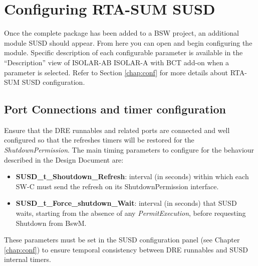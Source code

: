 \section{Configuring RTA-SUM SUSD}
Once the complete package has been added to a BSW project, an additional module SUSD should
appear. From here you can open and begin configuring the module. Specific description of each
configurable parameter is available in the “Description” view of 
\ifnum {}
{ISOLAR-AB}
\else
{ISOLAR-A with BCT add-on}
\fi
 when a parameter is selected.
Refer to Section \ref{chap:conf} for more details about RTA-SUM SUSD configuration.

\subsection{Port Connections and timer configuration}
Ensure that the DRE runnables and related ports are connected and well configured so that the refreshes timers will be restored for the \emph{ShutdownPermission}.
The main timing parameters to configure for the behaviour described in the Design Document are:
\begin{itemize}
\item \textbf{SUSD\_t\_Shoutdown\_Refresh}: interval (in seconds) within which each SW-C must send the refresh on its ShutdownPermission interface.
\item \textbf{SUSD\_t\_Force\_shutdown\_Wait}: interval (in seconds) that SUSD waits, starting from the absence of any \emph{PermitExecution}, before requesting Shutdown from BswM.
\end{itemize}
These parameters must be set in the SUSD configuration panel (see Chapter \ref{chap:conf}) to ensure temporal consistency between DRE runnables and SUSD internal timers.

